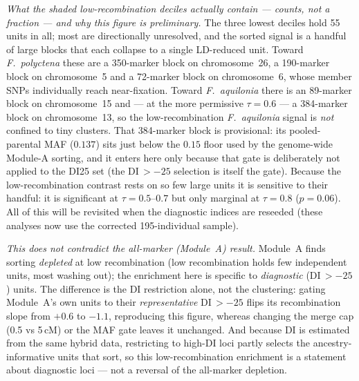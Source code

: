 \documentclass[11pt]{article}
\newcommand{\Faq}{\textit{F.~aquilonia}}
\newcommand{\Fpo}{\textit{F.~polyctena}}
\begin{document}
{%
\emph{What the shaded low-recombination deciles actually contain --- counts, not a fraction ---
and why this figure is preliminary.} The three lowest deciles hold 55 units in all; most are
directionally unresolved, and the sorted signal is a handful of large blocks that each collapse
to a single LD-reduced unit. Toward \Fpo{} these are a 350-marker block on chromosome~26, a
190-marker block on chromosome~5 and a 72-marker block on chromosome~6, whose member SNPs
individually reach near-fixation. Toward \Faq{} there is an 89-marker block on chromosome~15
and --- at the more permissive $\tau=0.6$ --- a 384-marker block on chromosome~13, so the
low-recombination \Faq{} signal is \emph{not} confined to tiny clusters. That 384-marker block
is provisional: its pooled-parental MAF ($0.137$) sits just below the $0.15$ floor used by the
genome-wide Module-A sorting, and it enters here only because that gate is deliberately not
applied to the DI25 set (the DI\,$>-25$ selection is itself the gate). Because the
low-recombination contrast rests on so few large units it is sensitive to their handful: it is
significant at $\tau=0.5$--$0.7$ but only marginal at $\tau=0.8$ ($p=0.06$). All of this will be
revisited when the diagnostic indices are reseeded (these analyses now use the corrected
195-individual sample).

\emph{This does not contradict the all-marker (Module~A) result.} Module~A finds sorting
\emph{depleted} at low recombination (low recombination holds few independent units, most washing
out); the enrichment here is specific to \emph{diagnostic} (DI\,$>-25$) units. The difference is
the DI restriction alone, not the clustering: gating Module~A's own units to their
\emph{representative} DI\,$>-25$ flips its recombination slope from $+0.6$ to $-1.1$, reproducing
this figure, whereas changing the merge cap (0.5 vs 5\,cM) or the MAF gate leaves it unchanged.
And because DI is estimated from the same hybrid data, restricting to high-DI loci partly selects
the ancestry-informative units that sort, so this low-recombination enrichment is a statement
about diagnostic loci --- not a reversal of the all-marker depletion.}
\end{document}
